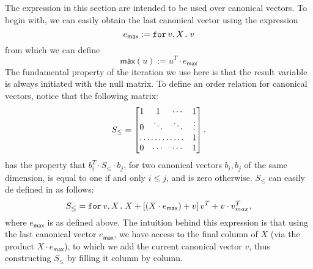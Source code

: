 The expression in this section are intended to be used over canonical vectors.
To begin with, we can easily obtain the last canonical vector using the expression $$e_{\mathsf{max}} := \texttt{for}\, v,X \texttt{.}\, v$$ from which we can define $$\mathsf{max}(u):=u^T\cdot e_{\mathsf{max}}$$
The fundamental property of the iteration we use here is that the result variable is always initiated with the null matrix.
To define an order relation for canonical vectors, notice that the following matrix:
\[
S_{\leq} = \begin{bmatrix}
    1 & 1 & \cdots &  1 \\
    0 & \ddots & \ddots & \vdots \\
    \hdotsfor{3} & 1 \\
    0 & \cdots & \cdots & 1 
\end{bmatrix}.
\]
has the property that $b_i^T\cdot S_{\leq} \cdot b_j$, for two canonical vectors $b_i,b_j$ of the same dimension, is equal to one if and only $i\leq j$, and is zero otherwise. $S_{\leq}$ can easily de defined in \langfor as follows:
$$S_{\leq}=\texttt{for}\, v,X \texttt{.}\, X + \left[ (X\cdot e_{\mathsf{max}}) + v \right]v^T + v\cdot v^T_{max},$$
where $e_{\mathsf{max}}$ is as defined above. The intuition behind this expression is that using the last canonical vector $e_{\mathsf{max}}$, we have access to the final column of $X$ (via the product $X\cdot e_{\mathsf{max}}$), to which we add the current canonical vector $v$, thus constructing $S_{\leq}$ by filling it column by column.

